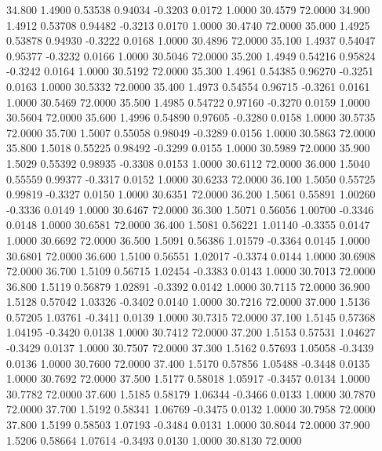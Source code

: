   34.800   1.4900   0.53538   0.94034  -0.3203   0.0172   1.0000  30.4579  72.0000
  34.900   1.4912   0.53708   0.94482  -0.3213   0.0170   1.0000  30.4740  72.0000
  35.000   1.4925   0.53878   0.94930  -0.3222   0.0168   1.0000  30.4896  72.0000
  35.100   1.4937   0.54047   0.95377  -0.3232   0.0166   1.0000  30.5046  72.0000
  35.200   1.4949   0.54216   0.95824  -0.3242   0.0164   1.0000  30.5192  72.0000
  35.300   1.4961   0.54385   0.96270  -0.3251   0.0163   1.0000  30.5332  72.0000
  35.400   1.4973   0.54554   0.96715  -0.3261   0.0161   1.0000  30.5469  72.0000
  35.500   1.4985   0.54722   0.97160  -0.3270   0.0159   1.0000  30.5604  72.0000
  35.600   1.4996   0.54890   0.97605  -0.3280   0.0158   1.0000  30.5735  72.0000
  35.700   1.5007   0.55058   0.98049  -0.3289   0.0156   1.0000  30.5863  72.0000
  35.800   1.5018   0.55225   0.98492  -0.3299   0.0155   1.0000  30.5989  72.0000
  35.900   1.5029   0.55392   0.98935  -0.3308   0.0153   1.0000  30.6112  72.0000
  36.000   1.5040   0.55559   0.99377  -0.3317   0.0152   1.0000  30.6233  72.0000
  36.100   1.5050   0.55725   0.99819  -0.3327   0.0150   1.0000  30.6351  72.0000
  36.200   1.5061   0.55891   1.00260  -0.3336   0.0149   1.0000  30.6467  72.0000
  36.300   1.5071   0.56056   1.00700  -0.3346   0.0148   1.0000  30.6581  72.0000
  36.400   1.5081   0.56221   1.01140  -0.3355   0.0147   1.0000  30.6692  72.0000
  36.500   1.5091   0.56386   1.01579  -0.3364   0.0145   1.0000  30.6801  72.0000
  36.600   1.5100   0.56551   1.02017  -0.3374   0.0144   1.0000  30.6908  72.0000
  36.700   1.5109   0.56715   1.02454  -0.3383   0.0143   1.0000  30.7013  72.0000
  36.800   1.5119   0.56879   1.02891  -0.3392   0.0142   1.0000  30.7115  72.0000
  36.900   1.5128   0.57042   1.03326  -0.3402   0.0140   1.0000  30.7216  72.0000
  37.000   1.5136   0.57205   1.03761  -0.3411   0.0139   1.0000  30.7315  72.0000
  37.100   1.5145   0.57368   1.04195  -0.3420   0.0138   1.0000  30.7412  72.0000
  37.200   1.5153   0.57531   1.04627  -0.3429   0.0137   1.0000  30.7507  72.0000
  37.300   1.5162   0.57693   1.05058  -0.3439   0.0136   1.0000  30.7600  72.0000
  37.400   1.5170   0.57856   1.05488  -0.3448   0.0135   1.0000  30.7692  72.0000
  37.500   1.5177   0.58018   1.05917  -0.3457   0.0134   1.0000  30.7782  72.0000
  37.600   1.5185   0.58179   1.06344  -0.3466   0.0133   1.0000  30.7870  72.0000
  37.700   1.5192   0.58341   1.06769  -0.3475   0.0132   1.0000  30.7958  72.0000
  37.800   1.5199   0.58503   1.07193  -0.3484   0.0131   1.0000  30.8044  72.0000
  37.900   1.5206   0.58664   1.07614  -0.3493   0.0130   1.0000  30.8130  72.0000
